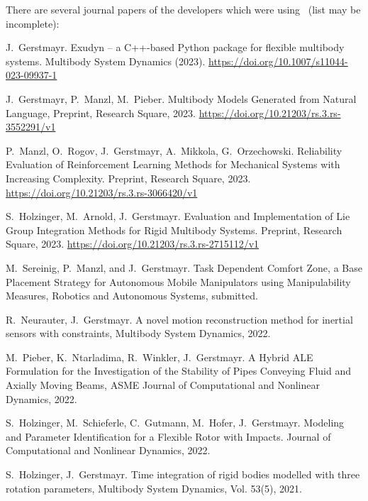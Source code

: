 There are several journal papers of the developers which were using \codeName\ (list may be incomplete):
\bi
  \item J.\ Gerstmayr. Exudyn -- a C++-based Python package for flexible multibody systems. Multibody System Dynamics (2023). \url{https://doi.org/10.1007/s11044-023-09937-1} 
  \item J.\ Gerstmayr, P.\ Manzl, M.\ Pieber. Multibody Models Generated from Natural Language, Preprint, Research Square, 2023. \url{https://doi.org/10.21203/rs.3.rs-3552291/v1} 
  \item P.\ Manzl, O.\ Rogov, J.\ Gerstmayr, A.\ Mikkola, G.\ Orzechowski. Reliability Evaluation of Reinforcement Learning Methods for Mechanical Systems with Increasing Complexity.  Preprint, Research Square, 2023.  \url{https://doi.org/10.21203/rs.3.rs-3066420/v1}
  \item S.\ Holzinger, M.\ Arnold, J.\ Gerstmayr. Evaluation and Implementation of Lie Group Integration Methods for Rigid Multibody Systems. Preprint, Research Square, 2023.  \url{https://doi.org/10.21203/rs.3.rs-2715112/v1} 
  \item M.\ Sereinig, P.\ Manzl, and J.\ Gerstmayr. Task Dependent Comfort Zone, a Base Placement Strategy for Autonomous Mobile Manipulators using Manipulability Measures, Robotics and Autonomous Systems, submitted. \cite{Sereinig2023comfortZone}
  \item R.\ Neurauter, J.\ Gerstmayr. A novel motion reconstruction method for inertial sensors with constraints, Multibody System Dynamics, 2022. \cite{NeurauterGerstmayr2023}
  \item M.\ Pieber, K.\ Ntarladima, R.\ Winkler, J.\ Gerstmayr. A Hybrid ALE Formulation for the Investigation of the Stability of Pipes Conveying Fluid and Axially Moving Beams, ASME Journal of Computational and Nonlinear Dynamics, 2022. 
  \item S.\ Holzinger, M.\ Schieferle, C.\ Gutmann, M.\ Hofer, J.\ Gerstmayr. Modeling and Parameter Identification for a Flexible Rotor with Impacts. Journal of Computational and Nonlinear Dynamics, 2022. 
  \item S.\ Holzinger, J.\ Gerstmayr. Time integration of rigid bodies modelled with three rotation parameters, Multibody System Dynamics, Vol. 53(5), 2021. 
